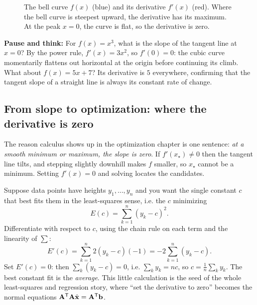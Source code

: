 \begin{figure}[htbp]
\centering
{}
\caption{The bell curve $f(x)$ (blue) and its derivative $f'(x)$ (red). Where the bell curve is steepest upward, the derivative has its maximum. At the peak $x=0$, the curve is flat, so the derivative is zero.}
\label{ch39:fig-bell-deriv}
\end{figure}

\begin{recoverybox}
\textbf{Pause and think:} For $f(x) = x^3$, what is the slope of the tangent line at $x=0$? By the
power rule, $f'(x) = 3x^2$, so $f'(0) = 0$: the cubic curve momentarily flattens out horizontal at
the origin before continuing its climb. What about $f(x) = 5x + 7$? Its derivative is $5$ everywhere,
confirming that the tangent slope of a straight line is always its constant rate of change.
\end{recoverybox}

\subsection{From slope to optimization: where the derivative is zero}
\label{ch39:optimization-1d}

The reason calculus shows up in the optimization chapter is one sentence: \emph{at a smooth minimum
or maximum, the slope is zero}. If $f'(x_\star) \ne 0$ then the tangent line tilts, and stepping
slightly downhill makes $f$ smaller, so $x_\star$ cannot be a minimum. Setting $f'(x) = 0$ and
solving locates the candidates.

\begin{example}
\label{ch39:ex-leastsq}
Suppose data points have heights $y_1, \dots, y_n$ and you want the single constant $c$ that best
fits them in the least-squares sense, i.e. the $c$ minimizing
\[
E(c) = \sum_{k=1}^{n} (y_k - c)^2.
\]
Differentiate with respect to $c$, using the chain rule on each term and the linearity of $\sum$:
\[
E'(c) = \sum_{k=1}^{n} 2(y_k - c)(-1) = -2\sum_{k=1}^{n}(y_k - c).
\]
Set $E'(c) = 0$: then $\sum_k (y_k - c) = 0$, i.e. $\sum_k y_k = nc$, so $c = \frac1n\sum_k y_k$.
The best constant fit is the \emph{average}. This little calculation is the seed of the whole
least-squares and regression story, where ``set the derivative to zero'' becomes the normal
equations $\mathbf{A}^{\mathsf{T}}\mathbf{A}\hat{\mathbf{x}} = \mathbf{A}^{\mathsf{T}}\mathbf{b}$.
\end{example}

